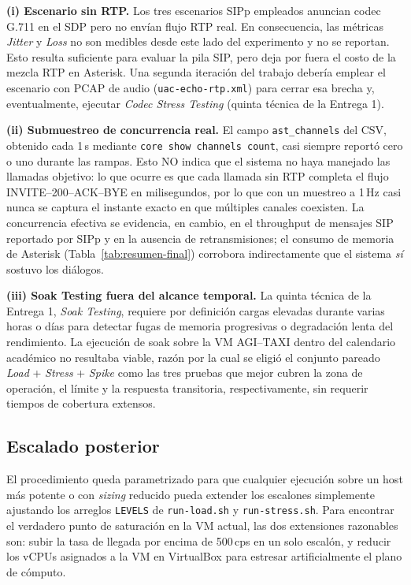 \documentclass[conference]{IEEEtran}
\begin{document}
\textbf{(i) Escenario sin RTP.} Los tres escenarios SIPp empleados
anuncian codec G.711 en el SDP pero no env\'ian flujo RTP real. En
consecuencia, las m\'etricas \textit{Jitter} y \textit{Loss} no son
medibles desde este lado del experimento y no se reportan. Esto resulta
suficiente para evaluar la pila SIP, pero deja por fuera el costo de
la mezcla RTP en Asterisk. Una segunda iteraci\'on del trabajo deber\'ia
emplear el escenario con PCAP de audio (\texttt{uac-echo-rtp.xml}) para
cerrar esa brecha y, eventualmente, ejecutar \textit{Codec Stress
Testing} (quinta t\'ecnica de la Entrega 1).

\textbf{(ii) Submuestreo de concurrencia real.} El campo
\texttt{ast\_channels} del CSV, obtenido cada 1\,s mediante
\texttt{core show channels count}, casi siempre report\'o cero o uno
durante las rampas. Esto NO indica que el sistema no haya manejado las
llamadas objetivo: lo que ocurre es que cada llamada sin RTP completa
el flujo INVITE--200--ACK--BYE en milisegundos, por lo que con un
muestreo a 1\,Hz casi nunca se captura el instante exacto en que
m\'ultiples canales coexisten. La concurrencia efectiva se evidencia,
en cambio, en el throughput de mensajes SIP reportado por SIPp y en la
ausencia de retransmisiones; el consumo de memoria de Asterisk
(Tabla~\ref{tab:resumen-final}) corrobora indirectamente que el sistema
\emph{s\'i} sostuvo los di\'alogos.

\textbf{(iii) Soak Testing fuera del alcance temporal.} La quinta
t\'ecnica de la Entrega 1, \textit{Soak Testing}, requiere por
definici\'on cargas elevadas durante varias horas o d\'ias para
detectar fugas de memoria progresivas o degradaci\'on lenta del
rendimiento. La ejecuci\'on de soak sobre la VM AGI--TAXI dentro del
calendario acad\'emico no resultaba viable, raz\'on por la cual se
eligi\'o el conjunto pareado \textit{Load} + \textit{Stress} +
\textit{Spike} como las tres pruebas que mejor cubren la zona de
operaci\'on, el l\'imite y la respuesta transitoria,
respectivamente, sin requerir tiempos de cobertura extensos.

\subsection{Escalado posterior}

El procedimiento queda parametrizado para que cualquier ejecuci\'on
sobre un host m\'as potente o con \textit{sizing} reducido pueda
extender los escalones simplemente ajustando los arreglos
\texttt{LEVELS} de \texttt{run-load.sh} y \texttt{run-stress.sh}. Para
encontrar el verdadero punto de saturaci\'on en la VM actual, las dos
extensiones razonables son: subir la tasa de llegada por encima de
500\,cps en un solo escal\'on, y reducir los vCPUs asignados a la VM
en VirtualBox para estresar artificialmente el plano de c\'omputo.
\end{document}
